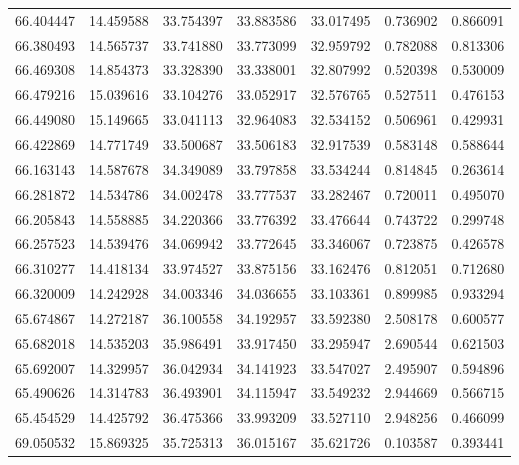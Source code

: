 \begin{tabular}{rrrrrrr}
 66.404447 &  14.459588 &         33.754397 &         33.883586 &         33.017495 &  0.736902 &  0.866091 \\
 66.380493 &  14.565737 &         33.741880 &         33.773099 &         32.959792 &  0.782088 &  0.813306 \\
 66.469308 &  14.854373 &         33.328390 &         33.338001 &         32.807992 &  0.520398 &  0.530009 \\
 66.479216 &  15.039616 &         33.104276 &         33.052917 &         32.576765 &  0.527511 &  0.476153 \\
 66.449080 &  15.149665 &         33.041113 &         32.964083 &         32.534152 &  0.506961 &  0.429931 \\
 66.422869 &  14.771749 &         33.500687 &         33.506183 &         32.917539 &  0.583148 &  0.588644 \\
 66.163143 &  14.587678 &         34.349089 &         33.797858 &         33.534244 &  0.814845 &  0.263614 \\
 66.281872 &  14.534786 &         34.002478 &         33.777537 &         33.282467 &  0.720011 &  0.495070 \\
 66.205843 &  14.558885 &         34.220366 &         33.776392 &         33.476644 &  0.743722 &  0.299748 \\
 66.257523 &  14.539476 &         34.069942 &         33.772645 &         33.346067 &  0.723875 &  0.426578 \\
 66.310277 &  14.418134 &         33.974527 &         33.875156 &         33.162476 &  0.812051 &  0.712680 \\
 66.320009 &  14.242928 &         34.003346 &         34.036655 &         33.103361 &  0.899985 &  0.933294 \\
 65.674867 &  14.272187 &         36.100558 &         34.192957 &         33.592380 &  2.508178 &  0.600577 \\
 65.682018 &  14.535203 &         35.986491 &         33.917450 &         33.295947 &  2.690544 &  0.621503 \\
 65.692007 &  14.329957 &         36.042934 &         34.141923 &         33.547027 &  2.495907 &  0.594896 \\
 65.490626 &  14.314783 &         36.493901 &         34.115947 &         33.549232 &  2.944669 &  0.566715 \\
 65.454529 &  14.425792 &         36.475366 &         33.993209 &         33.527110 &  2.948256 &  0.466099 \\
 69.050532 &  15.869325 &         35.725313 &         36.015167 &         35.621726 &  0.103587 &  0.393441 \\

\end{tabular}

